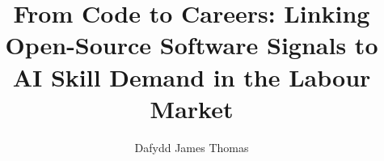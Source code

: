 \documentclass{mscthesis}
\title{From Code to Careers: Linking Open-Source Software Signals to AI Skill Demand in the Labour Market}
\author{Dafydd James Thomas}
\begin{document}
\setlength{\parindent}{10pt}\onehalfspacing\beforepreface





\clearpage{}






% 
% 
% 
% 
% 
% 





\renewcommand{\bibname}{References}
\printbibliography





\end{document}
